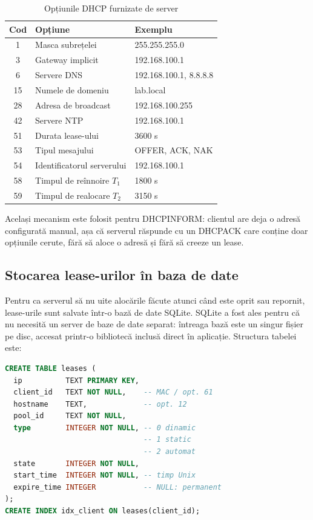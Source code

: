\documentclass[conference]{IEEEtran}
\begin{document}
\begin{table}[htbp]
\caption{Opțiunile DHCP furnizate de server}
\begin{center}
\begin{tabular}{|c|p{3cm}|p{2.6cm}|}
\hline
\textbf{Cod} & \textbf{Opțiune} & \textbf{Exemplu} \\
\hline
1 & Masca subrețelei & 255.255.255.0 \\
\hline
3 & Gateway implicit & 192.168.100.1 \\
\hline
6 & Servere DNS & 192.168.100.1, 8.8.8.8 \\
\hline
15 & Numele de domeniu & lab.local \\
\hline
28 & Adresa de broadcast & 192.168.100.255 \\
\hline
42 & Servere NTP & 192.168.100.1 \\
\hline
51 & Durata lease-ului & 3600 s \\
\hline
53 & Tipul mesajului & OFFER, ACK, NAK \\
\hline
54 & Identificatorul serverului & 192.168.100.1 \\
\hline
58 & Timpul de reînnoire $T_1$ & 1800 s \\
\hline
59 & Timpul de realocare $T_2$ & 3150 s \\
\hline
\end{tabular}
\label{tab:optiuni}
\end{center}
\end{table}

Același mecanism este folosit pentru DHCPINFORM: clientul are deja o adresă configurată manual, așa că serverul răspunde cu un DHCPACK care conține doar opțiunile cerute, fără să aloce o adresă și fără să creeze un lease.

\subsection{Stocarea lease-urilor în baza de date}\label{subsec:bd}
Pentru ca serverul să nu uite alocările făcute atunci când este oprit sau repornit, lease-urile sunt salvate într-o bază de date SQLite. SQLite a fost ales pentru că nu necesită un server de baze de date separat: întreaga bază este un singur fișier pe disc, accesat printr-o bibliotecă inclusă direct în aplicație. Structura tabelei este:
\begin{lstlisting}[language=SQL]
CREATE TABLE leases (
  ip          TEXT PRIMARY KEY,
  client_id   TEXT NOT NULL,    -- MAC / opt. 61
  hostname    TEXT,             -- opt. 12
  pool_id     TEXT NOT NULL,
  type        INTEGER NOT NULL, -- 0 dinamic
                                -- 1 static
                                -- 2 automat
  state       INTEGER NOT NULL,
  start_time  INTEGER NOT NULL, -- timp Unix
  expire_time INTEGER           -- NULL: permanent
);
CREATE INDEX idx_client ON leases(client_id);
\end{lstlisting}
\end{document}
